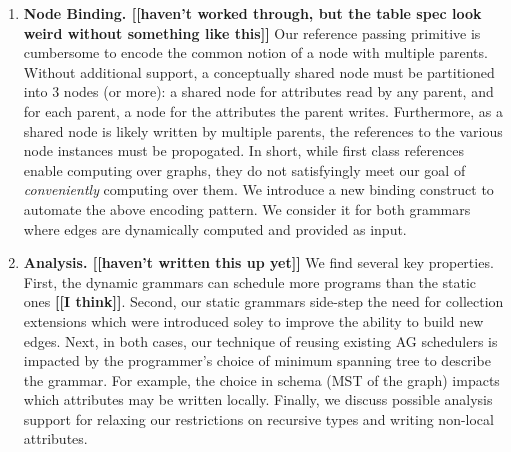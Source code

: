 \begin{enumerate}
\item \textbf{Node Binding. \textbf{[[haven't worked through, but the table spec look weird without something like this]]}} Our reference passing primitive is cumbersome to encode the common notion of a node with multiple parents. Without additional support, a conceptually shared node must be partitioned into 3 nodes (or more):
a shared node for attributes read by any parent, and for each parent, a node for the attributes the parent writes. Furthermore, as a shared node is likely written by multiple parents, the references to the various node instances must be propogated. In short, while first class references enable computing over graphs, they do not satisfyingly meet our goal of \emph{conveniently} computing over them. We introduce a new binding construct to automate the above encoding pattern. We consider it for both grammars where edges are dynamically computed and provided as input.
\item \textbf{Analysis. \textbf{[[haven't written this up yet]]}} We find several key properties. First, the dynamic grammars can schedule more programs than the static ones \textbf{[[I think]]}. Second, our static grammars side-step the need for collection extensions which were introduced soley to improve the ability to build new edges. Next, in both cases, our technique of reusing existing AG schedulers is impacted by the programmer's choice of minimum spanning tree to describe the grammar. For example, the choice in schema (MST of the graph) impacts which attributes may be written locally. Finally, we discuss possible analysis support for relaxing our restrictions on recursive types and writing non-local attributes.
\end{enumerate}
